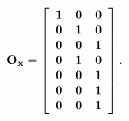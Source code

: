 \begin{equation}
{\bf O}_{\bf x}=\left[
             \begin{array}{ccc}
               \bf 1 & \bf 0 & \bf 0 \\
               \bf 0 & \bf 1 & \bf 0 \\
               \bf 0 & \bf 0 & \bf 1 \\
                \bf 0 & \bf 1 & \bf 0 \\
               \bf 0 & \bf 0 & \bf 1 \\
               \bf 0 & \bf 0 & \bf 1 \\
               \bf 0 & \bf 0 & \bf 1 \\
             \end{array}
           \right]. \\
\end{equation}

